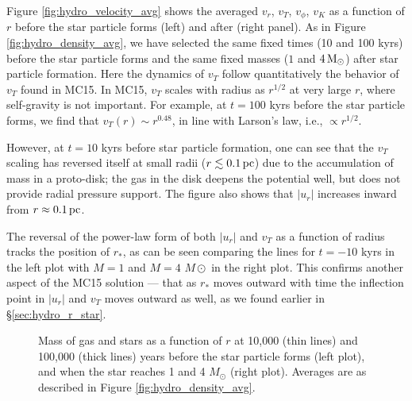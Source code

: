 \documentclass[../dissertation.tex]{subfiles}
\begin{document}
Figure \ref{fig:hydro_velocity_avg} shows the averaged $v_r$, $v_T$,  
$v_{\phi}$, $v_K$ as a function of $r$ before the star particle forms 
(left) and after (right panel).  As in Figure \ref{fig:hydro_density_avg}, 
we have selected the same fixed times (10 and 100 kyrs) before the star 
particle forms and the same fixed masses ($1$ and $4\,{\rm M}_{\odot}$) 
after star particle formation.  Here the dynamics of $v_T$ follow 
quantitatively the behavior of $v_T$ found in MC15. In MC15, $v_T$ 
scales with radius as $r^{1/2}$ at very large $r$, where self-gravity 
is not important. For example, at $t=100$ kyrs before 
the star particle forms, we find that $v_T(r)\sim r^{0.48}$, in line with
Larson's law, i.e., $\propto r^{1/2}$. 


However, at $t=10 $ kyrs before star particle formation, one can see
that the $v_T$ scaling has reversed itself at small 
radii ($r\lesssim0.1\,\rm pc$) due to the accumulation of mass in a 
proto-disk; the gas in the disk deepens the potential well, but does 
not provide radial pressure support. The figure also shows that $|u_r|$ 
increases inward from $r\approx0.1\,\rm pc$.

The reversal of the power-law form of both $|u_r|$ and 
$v_T$ as a function of radius tracks 
the position of $r_*$, as can be seen
comparing the lines for $t=-10$ kyrs in the left
plot with $M=1$ and $M=4$ $M\odot$ in the right plot. This confirms another
aspect of the MC15 solution --- that as $r_*$ moves outward with time the 
inflection point in $|u_r|$ and $v_T$ moves outward as well, as we found
earlier in \S \ref{sec:hydro_r_star}.

\begin{figure*}[htb] %
\caption[Hydro run of Mass]{Mass of gas and stars as a function of $r$ at 10,000 (thin lines) 
and 100,000 (thick lines) years before the star particle forms (left plot), 
and when the star reaches 1 and 4 $M_{\odot}$ (right plot). Averages 
are as described in Figure \ref{fig:hydro_density_avg}. \label{fig:hydro_mass_avg}}
\end{figure*}
\end{document}
